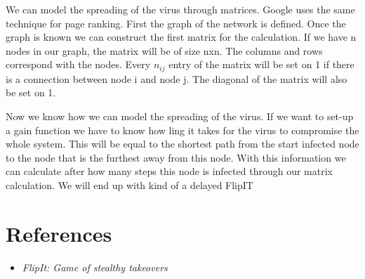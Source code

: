 \documentclass[a4paper, 11pt]{article}
\begin{document}
 We can model the spreading of the virus through matrices. Google uses the same technique for page ranking. First the graph of the network is defined. Once the graph is known we can construct the first matrix for the calculation. If we have n nodes in our graph, the matrix will be of size nxn. The columns and rows correspond with the nodes. Every $n_{ij}$ entry of the matrix will be set on 1 if there is a connection between node i and node j. The diagonal of the matrix will also be set on 1.
 
 Now we know how we can model the spreading of the virus. If we want to set-up a gain function we have to know how ling it takes for the virus to compromise the whole system. This will be equal to the shortest path from the start infected node to the node that is the furthest away from this node. With this information we can calculate after how many steps this node is infected through our matrix calculation. We will end up with kind of a delayed FlipIT
 
\section{References}
\begin{itemize}
\item \textit{FlipIt: Game of stealthy takeovers}
\end{itemize}
\end{document}
